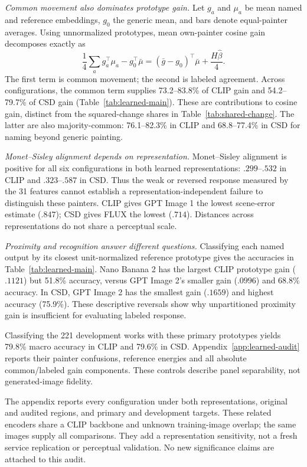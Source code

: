 \emph{Common movement also dominates prototype gain.}
Let $g_a$ and $\mu_a$ be mean named and reference embeddings, $g_0$ the generic
mean, and bars denote equal-painter averages. Using unnormalized prototypes,
mean own-painter cosine gain decomposes exactly as
\begin{equation}
\frac14\sum_a g_a^\top\mu_a-g_0^\top\bar\mu
=(\bar g-g_0)^\top\bar\mu+\frac{H\widehat\beta}{4}.
\label{eq:prototype-main}
\end{equation}
The first term is common movement; the second is labeled agreement.
Across configurations, the common term supplies 73.2--83.8\% of CLIP gain and
54.2--79.7\% of CSD gain (Table~\ref{tab:learned-main}). These are contributions
to cosine gain, distinct from the squared-change shares in
Table~\ref{tab:shared-change}. The latter are also majority-common:
76.1--82.3\% in CLIP and 68.8--77.4\% in CSD for naming beyond generic painting.



\emph{Monet--Sisley alignment depends on representation.}
Monet--Sisley alignment is positive for all six configurations in both learned
representations: $.299$--$.532$ in CLIP and $.323$--$.587$ in CSD. Thus the
weak or reversed response measured by the 31 features cannot establish a
representation-independent failure to distinguish these painters. CLIP gives
GPT Image 1 the lowest scene-error estimate ($.847$); CSD gives FLUX the
lowest ($.714$). Distances across representations do not share a perceptual scale.

\emph{Proximity and recognition answer different questions.}
Classifying each named output by its closest unit-normalized reference prototype
gives the accuracies in Table~\ref{tab:learned-main}. Nano Banana 2 has the largest
CLIP prototype gain ($.1121$) but 51.8\% accuracy, versus GPT Image 2's smaller
gain ($.0996$) and 68.8\% accuracy. In CSD, GPT Image 2 has the smallest gain
($.1659$) and highest accuracy (75.9\%). These descriptive reversals show why
unpartitioned proximity gain is insufficient for evaluating labeled response.

Classifying the 221 development works with these primary prototypes yields
79.8\% macro accuracy in CLIP and 79.6\% in CSD. Appendix~\ref{app:learned-audit}
reports their painter confusions, reference energies and all absolute
common/labeled gain components. These controls describe panel separability,
not generated-image fidelity.

The appendix reports every configuration under both representations, original
and audited regions, and primary and development targets. These related
encoders share a CLIP backbone and unknown training-image overlap; the same
images supply all comparisons. They add a representation sensitivity, not a
fresh service replication or perceptual validation. No new significance claims
are attached to this audit.

